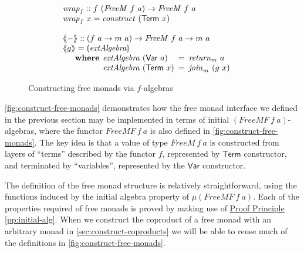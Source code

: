 \documentclass{jfp1}
\newcommand{\fold}[1]{\llparenthesis #1 \rrparenthesis}
\newcommand{\fmext}[1]{\langle\kern-0.25em\langle #1 \rangle\kern-0.25em\rangle}
\newcommand{\proofprinref}[1]{\hyperref[#1]{Proof Principle \ref*{#1}}}
\newcommand{\kw}[1]{\textbf{#1}}
\begin{document}
\begin{figure}
\begin{displaymath}
\begin{array}{@{}l}
      \\
      \begin{array}{@{}l}
        \mathit{wrap}_f :: f~(\mathit{FreeM}~f~a) \to \mathit{FreeM}~f~a \\
        \mathit{wrap}_f~x = \mathit{construct}~(\mathsf{Term}~x)
      \end{array} \\
      \\
      \begin{array}{@{}l}
        \fmext{-} :: (f~a \to m~a) \to \mathit{FreeM}~f~a \to m~a \\
        \fmext{g} = \fold{\mathit{extAlgebra}} \\
        \quad\begin{array}{r@{\hspace{0.4em}}l@{\hspace{0.5em}}c@{\hspace{0.5em}}l}
          \kw{where} & \mathit{extAlgebra}~(\mathsf{Var}~a) &=& \mathit{return}_m~a \\
          & \mathit{extAlgebra}~(\mathsf{Term}~x) &=& \mathit{join}_m~(g~x)
        \end{array}
      \end{array}
    \end{array}
  \end{displaymath}
  
  \caption{Constructing free monads via $f$-algebras}
\label{fig:construct-free-monads}
\end{figure}

\autoref{fig:construct-free-monads} demonstrates how the free monad
interface we defined in the previous section may be implemented in
terms of initial $(\mathit{FreeMF}~f~a)$-algebras, where the functor
$\mathit{FreeMF}~f~a$ is also defined in
\autoref{fig:construct-free-monads}. The key idea is that a value of
type $\mathit{FreeM}~f~a$ is constructed from layers of ``terms''
described by the functor $f$, represented by $\mathsf{Term}$
constructor, and terminated by ``variables'', represented by the
$\mathsf{Var}$ constructor.

The definition of the free monad structure is relatively
straightforward, using the functions induced by the initial algebra
property of $\mu (\mathit{FreeMF}~f~a)$. Each of the properties
required of free monads is proved by making use of
\proofprinref{pp:initial-alg}. When we construct the coproduct of a
free monad with an arbitrary monad in
\autoref{sec:construct-coproducts} we will be able to reuse much of
the definitions in \autoref{fig:construct-free-monads}.
\end{document}

